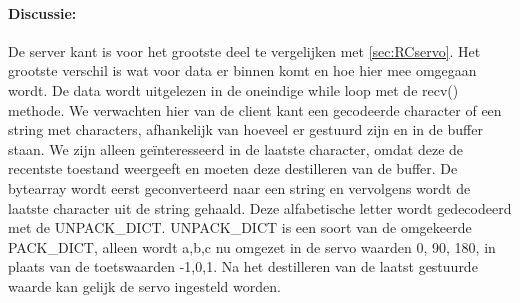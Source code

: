 \paragraph{Discussie:} De server kant is voor het grootste deel te vergelijken met \ref{sec:RCservo}. Het grootste verschil is wat voor data er binnen komt en hoe hier mee omgegaan wordt. De data wordt uitgelezen in de oneindige while loop met de recv() methode. We verwachten hier van de client kant een gecodeerde character of een string met characters, afhankelijk van hoeveel er gestuurd zijn en in de buffer staan. We zijn alleen ge\"interesseerd in de laatste character, omdat deze de recentste toestand weergeeft en moeten deze destilleren van de buffer. De bytearray wordt eerst geconverteerd naar een string en vervolgens wordt de laatste character uit de string gehaald. Deze alfabetische letter wordt gedecodeerd met de UNPACK\_DICT. UNPACK\_DICT is een soort van de omgekeerde PACK\_DICT, alleen wordt a,b,c nu omgezet in de servo waarden 0, 90, 180, in plaats van de toetswaarden -1,0,1. Na het destilleren van de laatst gestuurde waarde kan gelijk de servo ingesteld worden.\\


